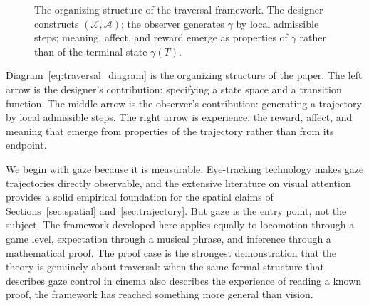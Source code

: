 \documentclass[12pt, a4paper]{article}
\theoremstyle{plain}
\theoremstyle{definition}
\theoremstyle{remark}
\newcommand{\X}{\mathcal{X}}
\newcommand{\A}{\mathcal{A}}
\newcommand{\traj}{\gamma}
\newcommand{\reward}{R}
\begin{document}
\begin{figure}[h]
\centering
{}
\caption{The organizing structure of the traversal
  framework. The designer constructs $(\X, \A)$; the
  observer generates $\traj$ by local admissible steps;
  meaning, affect, and reward emerge as properties of
  $\traj$ rather than of the terminal state $\traj(T)$.}
\label{fig:traversal_diagram}
\end{figure}

Diagram~\eqref{eq:traversal_diagram} is the organizing
structure of the paper. The left arrow is the designer's
contribution: specifying a state space and a transition
function. The middle arrow is the observer's contribution:
generating a trajectory by local admissible steps. The right
arrow is experience: the reward, affect, and meaning that
emerge from properties of the trajectory rather than from
its endpoint.

We begin with gaze because it is measurable. Eye-tracking
technology makes gaze trajectories directly observable,
and the extensive literature on visual attention provides
a solid empirical foundation for the spatial claims of
Sections~\ref{sec:spatial} and~\ref{sec:trajectory}. But
gaze is the entry point, not the subject. The framework
developed here applies equally to locomotion through a game
level, expectation through a musical phrase, and inference
through a mathematical proof. The proof case is the
strongest demonstration that the theory is genuinely about
traversal: when the same formal structure that describes
gaze control in cinema also describes the experience of
reading a known proof, the framework has reached something
more general than vision.
\end{document}
